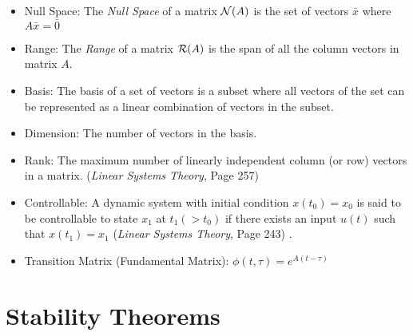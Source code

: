 \documentclass[12pt]{article}
\begin{document}
\begin{itemize}
\item Null Space: The {\em Null Space} of a matrix ${\cal N}(A)$ is the set of vectors $\bar{x}$ where $A\bar{x}=\bar{0}$

\item Range: The {\em Range} of a matrix ${\cal R}(A)$ is the span of all the column vectors in matrix $A$.

\item Basis: The basis of a set of vectors is a subset where all vectors of the set can be represented as a linear combination of vectors in the subset. 

\item Dimension: The number of vectors in the basis.

\item Rank: The maximum number of linearly independent column (or row) vectors in a matrix. ({\em Linear Systems Theory}, Page 257)

\item Controllable: A dynamic system with initial condition $x(t_0)=x_0$ is said to be controllable to state $x_1$ at $t_1(>t_0)$ if there exists an input $u(t)$ such that $x(t_1)=x_1$ ({\em Linear Systems Theory}, Page 243)  . 

\item Transition Matrix (Fundamental Matrix): $\phi(t,\tau)=e^{A(t-\tau)}$

\end{itemize}


\newpage
\section*{Stability Theorems}
\end{document}
